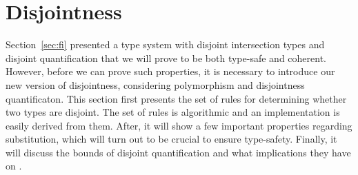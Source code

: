 \section{Disjointness} \label{sec:alg-dis}

Section~\ref{sec:fi} presented a type system with disjoint
intersection types and disjoint quantification that we will prove to be
both type-safe and coherent. 
However, before we can prove such properties, it is necessary to introduce our
new version of disjointness, considering polymorphism and disjointness quantificaton.
This section first presents the set of rules for determining whether two types are disjoint. 
The set of rules is algorithmic and an implementation is easily derived from them. 
After, it will show a few important properties regarding substitution, which will turn out
to be crucial to ensure type-safety.
Finally, it will discuss the bounds of disjoint quantification and what implications
they have on \name.

